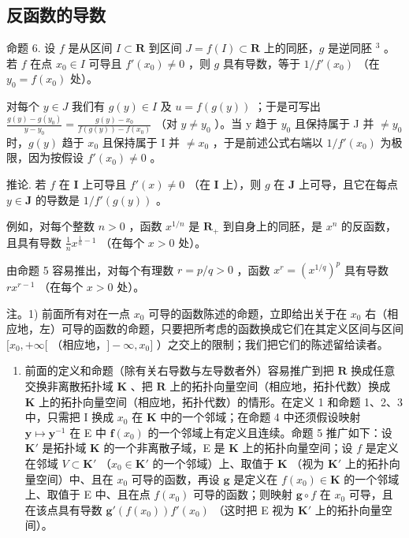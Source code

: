 \subsection{反函数的导数}

命题 6. 设 \(f\) 是从区间 \(I \subset \mathbf{R}\) 到区间 \(J = f(I) \subset \mathbf{R}\) 上的同胚，\(g\) 是逆同胚 \(^3\) 。若 \(f\) 在点 \(x_0 \in I\) 可导且 \(f'(x_0) \neq 0\) ，则 \(g\) 具有导数，等于 \(1/f'(x_0)\) （在 \(y_0 = f(x_0)\) 处）。

对每个 \(y \in J\) 我们有 \(g(y) \in I\) 及 \(u = f(g(y))\) ；于是可写出 \(\frac{g(y) - g(y_0)}{y - y_0} = \frac{g(y) - x_0}{f(g(y)) - f(x_0)}\) （对 \(y \neq y_0\) ）。当 y 趋于 \(y_0\) 且保持属于 J 并 \(\neq y_0\) 时，\(g(y)\) 趋于 \(x_0\) 且保持属于 I 并 \(\neq x_0\) ，于是前述公式右端以 \(1/f'(x_0)\) 为极限，因为按假设 \(f'(x_0) \neq 0\) 。

推论. 若 \(f\) 在 \(\mathbf{I}\) 上可导且 \(f'(x) \neq 0\) （在 \(\mathbf{I}\) 上），则 \(g\) 在 \(\mathbf{J}\) 上可导，且它在每点 \(y \in \mathbf{J}\) 的导数是 \(1 / f'(g(y))\) 。

例如，对每个整数 \(n > 0\) ，函数 \(x^{1 / n}\) 是 \(\mathbf{R}_+\) 到自身上的同胚，是 \(x^n\) 的反函数，且具有导数 \(\frac{1}{n} x^{\frac{1}{n} - 1}\) （在每个 \(x > 0\) 处）。

由命题 5 容易推出，对每个有理数 \(r = p / q > 0\) ，函数 \(x^{r} = (x^{1 / q})^{p}\) 具有导数 \(rx^{r - 1}\) （在每个 \(x > 0\) 处）。

注。1) 前面所有对在一点 \(x_0\) 可导的函数陈述的命题，立即给出关于在 \(x_0\) 右（相应地，左）可导的函数的命题，只要把所考虑的函数换成它们在其定义区间与区间 \([x_0, +\infty[\) （相应地，\(] - \infty, x_0]\) ）之交上的限制；我们把它们的陈述留给读者。

\begin{enumerate}
\def\labelenumi{\arabic{enumi})}
\setcounter{enumi}{1}
\tightlist
\item
  前面的定义和命题（除有关右导数与左导数者外）容易推广到把 \(\mathbf{R}\) 换成任意交换非离散拓扑域 \(\mathbf{K}\) 、把 \(\mathbf{R}\) 上的拓扑向量空间（相应地，拓扑代数）换成 \(\mathbf{K}\) 上的拓扑向量空间（相应地，拓扑代数）的情形。在定义 1 和命题 1、2、3 中，只需把 I 换成 \(x_0\) 在 \(\mathbf{K}\) 中的一个邻域；在命题 4 中还须假设映射 \(\mathbf{y} \mapsto \mathbf{y}^{-1}\) 在 E 中 \(\mathbf{f}(x_0)\) 的一个邻域上有定义且连续。命题 5 推广如下：设 \(\mathbf{K}'\) 是拓扑域 \(\mathbf{K}\) 的一个非离散子域，E 是 \(\mathbf{K}\) 上的拓扑向量空间；设 \(f\) 是定义在邻域 \(V \subset \mathbf{K}'\) （\(x_0 \in \mathbf{K}'\) 的一个邻域）上、取值于 \(\mathbf{K}\) （视为 \(\mathbf{K}'\) 上的拓扑向量空间）中、且在 \(x_0\) 可导的函数，再设 \(\mathbf{g}\) 是定义在 \(f(x_0) \in \mathbf{K}\) 的一个邻域上、取值于 E 中、且在点 \(f(x_0)\) 可导的函数；则映射 \(\mathbf{g} \circ f\) 在 \(x_0\) 可导，且在该点具有导数 \(\mathbf{g}'(f(x_0))f'(x_0)\) （这时把 E 视为 \(\mathbf{K}'\) 上的拓扑向量空间）。
\end{enumerate}

